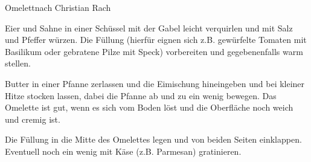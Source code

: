 \begin{recipe}{Omelett}{nach Christian Rach}
  \inglist
  
  \steps
  Eier und Sahne in einer Schüssel mit der Gabel leicht verquirlen und mit Salz und
  Pfeffer würzen. Die Füllung (hierfür eignen sich z.B. gewürfelte Tomaten mit Basilikum
  oder gebratene Pilze mit Speck) vorbereiten und gegebenenfalls warm stellen.

  Butter in einer Pfanne zerlassen und die Eimischung hineingeben und bei kleiner Hitze
  stocken lassen, dabei die Pfanne ab und zu ein wenig bewegen. Das Omelette ist gut, wenn
  es sich vom Boden löst und die Oberfläche noch weich und cremig ist.

  Die Füllung in die Mitte des Omelettes legen und von beiden Seiten einklappen. Eventuell
  noch ein wenig mit Käse (z.B. Parmesan) gratinieren.
  
\end{recipe}
